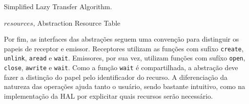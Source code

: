 			\begin{algorithm}
				\caption{Simplified Lazy Transfer Algorithm.}%
				\label{euclid}%
				\begin{algorithmic}[1]
				\Require $resources$, Abstraction Resource Table


						\Else
						\EndIf
					\EndProcedure%


						\Else
						\EndIf
					\EndProcedure%


						                                
					\EndProcedure%

				\end{algorithmic}%

			\end{algorithm}

			Por fim, as interfaces das abstrações seguem uma convenção para distinguir os papeis de receptor e emissor.
			Receptores utilizam as funções com sufíxo \texttt{create}, \texttt{unlink}, \texttt{aread} e \texttt{wait}.
			Emissores, por sua vez, utilizam funções com sufíxo \texttt{open}, \texttt{close}, \texttt{awrite} e \texttt{wait}.
			Como a função \texttt{wait} é compartilhada, a abstração deve fazer a distinção do papel pelo identificador do recurso.
			A diferenciação da natureza das operações ajuda tanto o usuário, sendo bastante intuitivo, como na implementação da HAL por explicitar quais recursos serão necessário.


